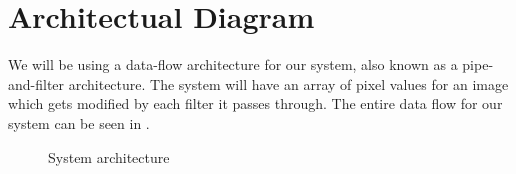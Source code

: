 \chapter{Architectual Diagram}

We will be using a data-flow architecture for our system, also known as a pipe-and-filter architecture. 
The system will have an array of pixel values for an image which gets modified by each filter it passes through.
The entire data flow for our system can be seen in .
\newline

\begin{figure}[!h]
\noindent\resizebox{\textwidth}{!}{
  
}
\caption{System architecture}
\label{fig:architecture}
\end{figure}